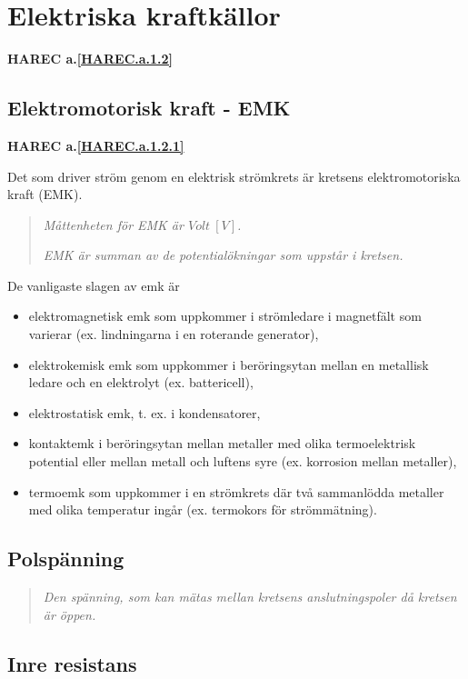 \section{Elektriska kraftkällor}
\textbf{HAREC a.\ref{HAREC.a.1.2}\label{myHAREC.a.1.2}}

\subsection{Elektromotorisk kraft - EMK}
\textbf{HAREC a.\ref{HAREC.a.1.2.1}\label{myHAREC.a.1.2.1}}

Det som driver ström genom en elektrisk strömkrets är kretsens elektromotoriska
kraft (EMK).

\begin{quote}
\emph{Måttenheten för EMK är \(Volt\ [V]\).}

\emph{EMK är summan av de potentialökningar som uppstår i kretsen.}
\end{quote}

De vanligaste slagen av emk är
\begin{itemize}
\item elektromagnetisk emk som uppkommer i strömledare i magnetfält som
varierar (ex. lindningarna i en roterande generator),
\item elektrokemisk emk som uppkommer i beröringsytan mellan en metallisk
ledare och en elektrolyt (ex. battericell),
\item elektrostatisk emk, t. ex. i kondensatorer,
\item kontaktemk i beröringsytan mellan metaller med olika termoelektrisk
potential eller mellan metall och luftens syre (ex. korrosion mellan metaller),
\item termoemk som uppkommer i en strömkrets där två sammanlödda metaller med
olika temperatur ingår (ex. termokors för strömmätning).
\end{itemize}

\subsection{Polspänning}

\begin{quote}\emph{
Den spänning, som kan mätas mellan kretsens anslutningspoler då kretsen är öppen.
}\end{quote}

\subsection{Inre resistans}

